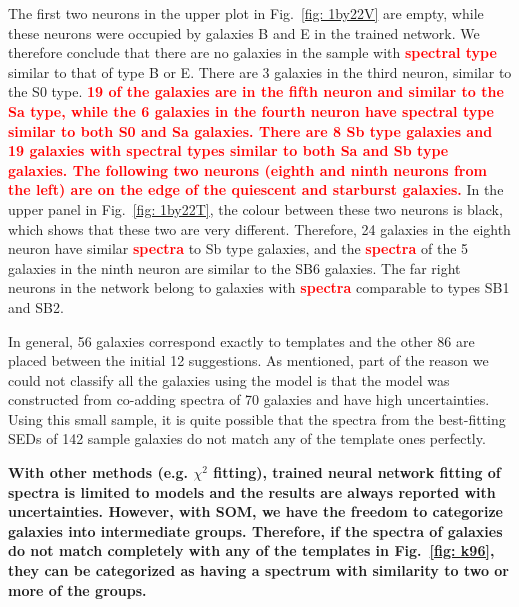             The first two neurons in the upper plot in Fig.~\ref{fig: 1by22V} are empty, while these neurons were occupied by galaxies B and E in the trained network.
            We therefore conclude that there are no galaxies in the  sample with \textbf{\textcolor{red}{spectral type}} similar to that of type B or E.
            There are 3 galaxies in the third neuron, similar to the S0 type. 
            \textbf{\textcolor{red}{19 of the galaxies are in the fifth neuron and similar to the Sa type, while the 6 galaxies in the fourth neuron have spectral type similar to both S0 and Sa galaxies.
            There are 8 Sb type galaxies and 19 galaxies with spectral types similar to both Sa and Sb type galaxies.
            The following two neurons (eighth and ninth neurons from the left) are on the edge of the quiescent and starburst galaxies.}}
            In the upper panel in Fig.~\ref{fig: 1by22T}, the colour between these two neurons is black, which shows that these two are very different.
            Therefore, 24 galaxies in the eighth neuron have similar \textbf{\textcolor{red}{spectra}} to Sb type galaxies, and the \textbf{\textcolor{red}{spectra}} of the 5 galaxies in the ninth neuron are similar to the SB6 galaxies.
            The far right neurons in the network belong to galaxies with \textbf{\textcolor{red}{spectra}} comparable to types SB1 and SB2.
            
            In general, 56 galaxies correspond exactly to  templates and the other 86 are placed between the initial 12 suggestions.
            As  mentioned, part of the reason we could not classify all the galaxies using the  model is that the model was constructed from co-adding spectra of 70 galaxies and have high uncertainties.
            Using this small sample, it is quite possible that the spectra from the best-fitting SEDs of 142 sample galaxies do not match any of the template ones perfectly. 
            
           \textbf{With other methods (e.g. $\chi^2$ fitting), trained neural network fitting of spectra is limited to models and the results are always reported with uncertainties.
            However, with SOM, we have the freedom to categorize galaxies into intermediate groups.
            Therefore, if the spectra of galaxies do not match completely with any of the  templates in Fig.~\ref{fig: k96}, they can be categorized as having a spectrum with similarity to two or more of the groups.}

